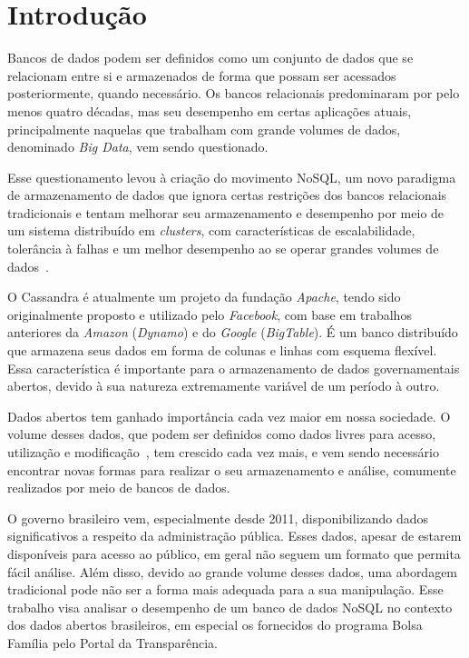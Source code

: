 \chapter{Introdução}

Bancos de dados podem ser definidos como um conjunto de dados que se relacionam entre si e armazenados de forma que possam ser acessados posteriormente, quando necessário.
Os bancos relacionais predominaram por pelo menos quatro décadas, mas seu desempenho em certas aplicações atuais, principalmente naquelas que trabalham com grande volumes de dados, denominado \emph{Big Data}, vem sendo questionado. 

Esse questionamento levou à criação do movimento NoSQL, um novo paradigma de armazenamento de dados que ignora certas restrições dos bancos relacionais tradicionais e tentam melhorar seu armazenamento e desempenho por meio de um sistema distribuído em \emph{clusters}, com características de escalabilidade, tolerância à falhas e um melhor desempenho ao se operar grandes volumes de dados~\cite{pramod}.

O Cassandra é atualmente um projeto da fundação \emph{Apache}, tendo sido  originalmente proposto e utilizado pelo \emph{Facebook}, com base em trabalhos anteriores da \emph{Amazon} (\emph{Dynamo}) e do \emph{Google} (\emph{BigTable}). É um banco distribuído que armazena seus dados em forma de colunas e linhas com esquema flexível. Essa característica é importante para o armazenamento de dados governamentais abertos, devido à sua natureza extremamente variável de um período à outro.

Dados abertos tem ganhado importância cada vez maior em nossa sociedade. O volume desses dados, que podem ser definidos como dados livres para acesso, utilização e modificação~\cite{opendefinition}, tem crescido cada vez mais, e vem sendo necessário encontrar novas formas para realizar o seu armazenamento e análise, comumente realizados por meio de bancos de dados.

O governo brasileiro vem, especialmente desde 2011, disponibilizando dados significativos a respeito da administração pública. Esses dados, apesar de estarem disponíveis para acesso ao público, em geral não seguem um formato que permita fácil análise. Além disso, devido ao grande volume desses dados, uma abordagem tradicional pode não ser a forma mais adequada para a sua manipulação. Esse trabalho visa analisar o desempenho de um banco de dados NoSQL no contexto dos dados abertos brasileiros, em especial os fornecidos do programa Bolsa Família pelo Portal da Transparência.

